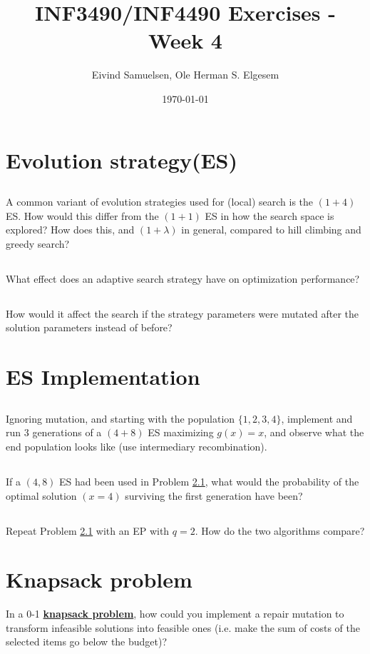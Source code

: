 \documentclass{article}           %
\title{\vspace{-2cm}INF3490/INF4490 Exercises - Week 4}
\author{Eivind Samuelsen, Ole Herman S. Elgesem}
\date{\today}
\newcommand\marginsymbol[1][0pt]{%
  \tabto*{0cm}\makebox[\dimexpr-1cm-#1\relax][r]{$\mathbb{P}$}\tabto*{\TabPrevPos}}
\begin{document}
    \renewcommand\marginsymbol[1][0pt]{%
  \tabto*{0cm}\makebox[-1cm][c]{$\mathbb{P}$}\tabto*{\TabPrevPos}}

\maketitle


\section{Evolution strategy(ES)} %
\subsection{} %
A common variant of evolution strategies used for (local) search is the \((1 + 4)\) ES.
How would this differ from the \((1 + 1)\) ES in how the search space is explored?
How does this, and \((1 + \lambda)\) in general, compared to hill climbing and greedy search?
\subsection{} %
What effect does an adaptive search strategy have on optimization performance?
\subsection{} %
How would it affect the search if the strategy parameters were mutated after the solution parameters instead of before?
\section{ES Implementation} %
\subsection{\marginsymbol} %
\label{subsec:w4e3a}
Ignoring mutation, and starting with the population \(\{1, 2, 3, 4\}\),
implement and run 3 generations of a \((4 + 8)\) ES maximizing \(g(x) = x\), and observe what the end population looks like (use intermediary recombination).
\subsection{} %
If a \((4, 8)\) ES had been used in Problem \ref{subsec:w4e3a}, what would the probability of the optimal solution \((x = 4)\) surviving the first generation have been?
\subsection{\marginsymbol} %
Repeat Problem \ref{subsec:w4e3a} with an EP with \(q = 2\). How do the two algorithms compare?
\section{Knapsack problem}
In a 0-1 \href{https://en.wikipedia.org/wiki/Knapsack_problem}{\textbf{knapsack problem}}, how could you implement a repair mutation to transform infeasible solutions into feasible ones
(i.e. make the sum of costs of the selected items go below the budget)?


\end{document}
